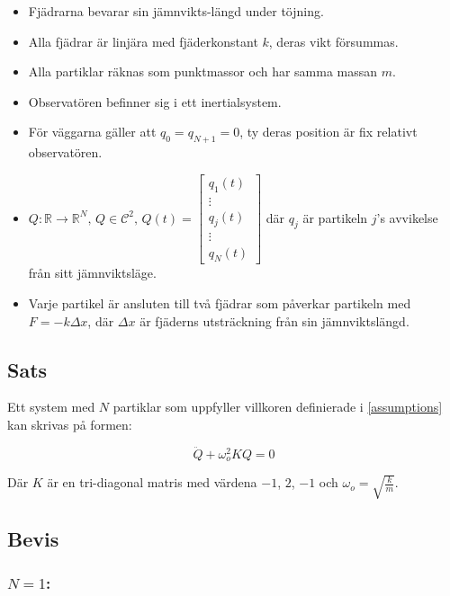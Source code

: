 \documentclass[12pt,a4paper]{article}
\newcommand{\R}{\ensuremath{\mathbb{R}}}
\begin{document}
\begin{appendix}
		\begin{itemize}
			\item Fjädrarna bevarar sin jämnvikts-längd under töjning.
			\item Alla fjädrar är linjära med fjäderkonstant $k$, deras vikt försummas.
			\item Alla partiklar räknas som punktmassor och har samma massan $m$.
			\item Observatören befinner sig i ett inertialsystem.
			\item För väggarna gäller att $q_0 = q_{N+1} = 0$, ty deras position är fix relativt observatören.
			\item $Q: \R \rightarrow \R^N,\, Q \in \mathcal{C}^2,\,Q(t) = \begin{bmatrix}q_1(t) \\ \vdots \\ q_j(t) \\ \vdots \\ q_N(t) \end{bmatrix}$ där $q_j$ är
			      partikeln $j$'s avvikelse från sitt jämnviktsläge.
			\item Varje partikel är ansluten till två fjädrar som påverkar partikeln
			      med $F = -k \Delta x$, där $\Delta x$ är fjäderns utsträckning från sin jämnviktslängd.
		\end{itemize}
	
	
	\subsection{Sats}
		\label{sats}
		
		Ett system med $N$ partiklar som uppfyller villkoren definierade i \ref{assumptions} kan skrivas
		på formen:
		
		\begin{equation*}
			\ddot{Q} + \omega_{o}^{2} K Q = 0
		\end{equation*}
		
		Där $K$ är en tri-diagonal matris med värdena $-1$, $2$, $-1$ och $\omega_o = \sqrt{\frac{k}{m}}$.
		
	\newpage
	
	\subsection{Bevis}
	\subsubsection*{$N=1$:}
		

\end{appendix}
\end{document}

